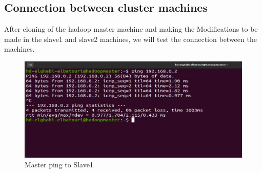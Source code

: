 \begin{spacing}{1.2}
\section{Connection between cluster machines}

\par After cloning of the hadoop master machine and making the Modifications to be made in the slave1 and slave2 machines, we will test the connection between the machines.
\\
\begin{figure}[!htb] 
\begin{center} 
\includegraphics[width=1\linewidth]{Big_Data/Hadoop/Multi-Nodes Cluster/Master ping to Slave1} 
\end{center} 
\caption{Master ping to Slave1} 
\end{figure} 
\FloatBarrier


\end{spacing}
